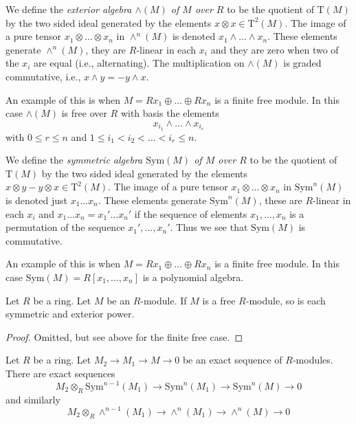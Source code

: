 \medskip\noindent
We define the {\it exterior algebra $\wedge(M)$ of $M$ over $R$}
to be the quotient of $\text{T}(M)$ by the two sided
ideal generated by the elements $x \otimes x \in \text{T}^2(M)$.
The image of a pure tensor $x_1 \otimes \ldots \otimes x_n$
in $\wedge^n(M)$ is denoted $x_1 \wedge \ldots \wedge x_n$.
These elements generate $\wedge^n(M)$, they are $R$-linear
in each $x_i$ and they are zero when two of the $x_i$ are equal
(i.e., alternating). The multiplication on $\wedge(M)$ is
graded commutative, i.e., $x \wedge y = - y \wedge x$.

\medskip\noindent
An example of this is when $M = Rx_1 \oplus \ldots \oplus Rx_n$
is a finite free module. In this case $\wedge(M)$ is free over
$R$ with basis the elements
$$
x_{i_1} \wedge \ldots \wedge x_{i_r}
$$
with $0 \leq r \leq n$ and $1 \leq i_1 < i_2 < \ldots < i_r \leq n$.

\medskip\noindent
We define the {\it symmetric algebra $\text{Sym}(M)$ of $M$ over $R$}
to be the quotient of $\text{T}(M)$ by the two sided
ideal generated by the elements $x \otimes y - y \otimes x \in \text{T}^2(M)$.
The image of a pure tensor $x_1 \otimes \ldots \otimes x_n$
in $\text{Sym}^n(M)$ is denoted just $x_1 \ldots x_n$.
These elements generate $\text{Sym}^n(M)$, these are $R$-linear
in each $x_i$ and $x_1 \ldots x_n = x_1' \ldots x_n'$ if the
sequence of elements $x_1, \ldots, x_n$ is a permutation of the
sequence $x_1', \ldots, x_n'$. Thus we see that $\text{Sym}(M)$
is commutative.

\medskip\noindent
An example of this is when $M = Rx_1 \oplus \ldots \oplus Rx_n$
is a finite free module. In this case
$\text{Sym}(M) = R[x_1, \ldots, x_n]$ is a polynomial algebra.

\begin{lemma}
\label{lemma-free-tensor-algebra}
Let $R$ be a ring. Let $M$ be an $R$-module.
If $M$ is a free $R$-module, so is each symmetric and exterior power.
\end{lemma}

\begin{proof}
Omitted, but see above for the finite free case.
\end{proof}

\begin{lemma}
\label{lemma-presentation-sym-exterior}
Let $R$ be a ring.
Let $M_2 \to M_1 \to M\to 0$ be an exact sequence of $R$-modules.
There are exact sequences
$$
M_2 \otimes_R \text{Sym}^{n - 1}(M_1)
\to
\text{Sym}^n(M_1)
\to
\text{Sym}^n(M)
\to
0
$$
and similarly
$$
M_2 \otimes_R \wedge^{n - 1}(M_1)
\to
\wedge^n(M_1)
\to
\wedge^n(M)
\to
0
$$
\end{lemma}

